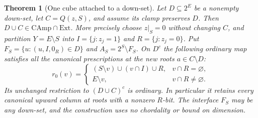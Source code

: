 \documentclass[11pt]{article}
\newtheorem{theorem}{Theorem}[section]
\theoremstyle{definition}
\begin{document}
\begin{theorem}[One cube attached to a down-set]\label{thm:downset-attachment}
Let $D\subseteq2^E$ be a nonempty down-set, let $C=Q(z,S)$, and
assume its clamp preserves $D$. Then $D\cup C\in\mathrm{CAmp}\cap\mathrm{Ext}$.
More precisely choose $z|_S=0$ without changing $C$, and partition
$Y=E\setminus S$ into $I=\{j:z_j=1\}$ and $R=\{j:z_j=0\}$.
Put $F_S=\{u:(u,I,0_R)\in D\}$ and $A_S=2^S\setminus F_S$.
On $D^c$ the following ordinary map satisfies all the canonical
prescriptions at the new roots $a\in C\setminus D$:
\begin{equation}\label{eq:downset-attachment-map}
 r_0(v)=
 \begin{cases}
 (S\setminus v)\cup(v\cap I)\cup R,&v\cap R=\varnothing,\\
 E\setminus v,&v\cap R\ne\varnothing.
 \end{cases}
\end{equation}
Its unchanged restriction to $(D\cup C)^c$ is ordinary. In particular
it retains every canonical upward column at roots with a nonzero $R$-bit.
The interface $F_S$ may be any down-set, and the construction uses no
chordality or bound on dimension.
\end{theorem}
\end{document}
